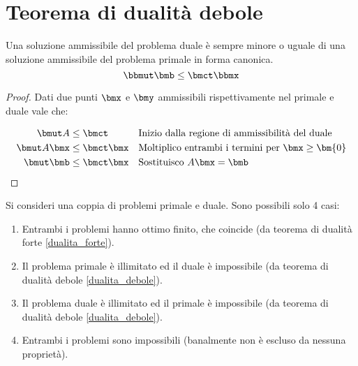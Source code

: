 \documentclass[\main/main.tex]{subfiles}
\begin{document}
\section{Teorema di dualità debole}
\begin{theorem}
  \label{dualita_debole}
  Una soluzione ammissibile del problema duale è sempre minore o uguale di una soluzione ammissibile del problema primale in forma canonica.
  \[
    \bbmut \bmb \leq \bmct\bbmx
  \]
\end{theorem}



\begin{proof}
  Dati due punti $\bmx$ e $\bmy$ ammissibili rispettivamente nel primale e duale vale che:

  \begin{align*}
    \bmut A     & \leq \bmct     &  & \text{Inizio dalla regione di ammissibilità del duale}      \\
    \bmut A\bmx & \leq \bmct\bmx &  & \text{Moltiplico entrambi i termini per $\bmx \geq \bm{0}$} \\
    \bmut \bmb  & \leq \bmct\bmx &  & \text{Sostituisco $A\bmx = \bmb$}
  \end{align*}
\end{proof}

\begin{corollary}
  Si consideri una coppia di problemi primale e duale. Sono possibili solo 4 casi:
  \begin{enumerate}
    \item Entrambi i problemi hanno ottimo finito, che coincide (da teorema di dualità forte \ref{dualita_forte}).
    \item Il problema primale è illimitato ed il duale è impossibile (da teorema di dualità debole \ref{dualita_debole}).
    \item Il problema duale è illimitato ed il primale è impossibile (da teorema di dualità debole \ref{dualita_debole}).
    \item Entrambi i problemi sono impossibili (banalmente non è escluso da nessuna proprietà).
  \end{enumerate}
\end{corollary}
\end{document}
